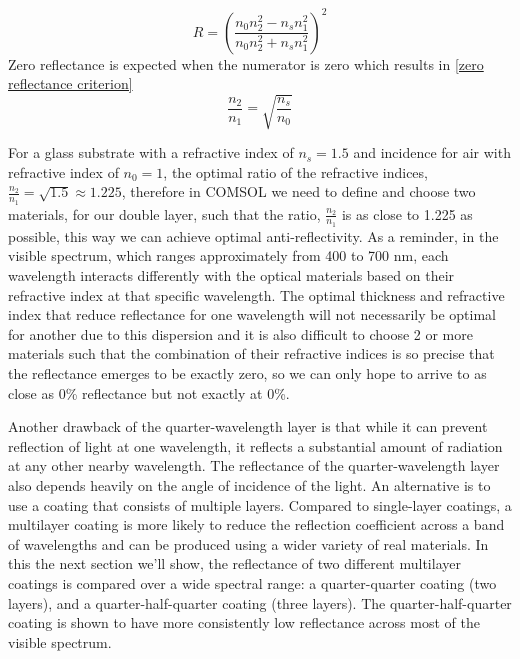 \begin{equation}\label{reflectance for 2-layer antireflecting films - chap4}
    R = \left(\frac{n_0n_2^2 - n_sn_1^2}{n_0n_2^2 + n_sn_1^2}\right)^2
\end{equation}
Zero reflectance is expected when the numerator is zero which results in \ref{zero reflectance criterion}
\begin{equation}\label{zero reflectance criterion - chap4}
    \frac{n_2}{n_1} = \sqrt{\frac{n_s}{n_0}}
\end{equation}

For a glass substrate with a refractive index of $n_s = 1.5$ and incidence for air with refractive index of $n_0 = 1$, the optimal ratio of the refractive indices, $\frac{n_2}{n_1} = \sqrt{1.5} \approx 1.225$, therefore in COMSOL we need to define and choose two materials, for our double layer, such that the ratio, $\frac{n_2}{n_1}$ is as close to 1.225 as possible, this way we can achieve optimal anti-reflectivity. As a reminder, in the visible spectrum, which ranges approximately from 400 to 700 nm, each wavelength interacts differently with the optical materials based on their refractive index at that specific wavelength. The optimal thickness and refractive index that reduce reflectance for one wavelength will not necessarily be optimal for another due to this dispersion and it is also difficult to choose 2 or more materials such that the combination of their refractive indices is so precise that the reflectance emerges to be exactly zero, so we can only hope to arrive to as close as 0\% reflectance but not exactly at 0\%.

Another drawback of the quarter-wavelength layer is that while it can prevent reflection of light at one wavelength, it reflects a substantial amount of radiation at any other nearby wavelength. The reflectance of the quarter-wavelength layer also depends heavily on the angle of incidence of the light. An alternative is to use a coating that consists of multiple layers. Compared to single-layer coatings, a multilayer coating is more likely to reduce the reflection coefficient across a band of wavelengths and can be produced using a wider variety of real materials.
In this the next section we'll show, the reflectance of two different multilayer coatings is compared over a wide spectral range: a quarter-quarter coating (two layers), and a quarter-half-quarter coating (three layers). The quarter-half-quarter coating is shown to have more consistently low reflectance across most of the visible spectrum. %

